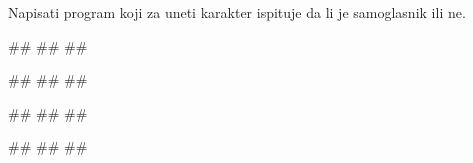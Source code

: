 \begin{Exercise}[label=KT_NG_24] 
Napisati program koji za uneti karakter ispituje da li je samoglasnik ili ne.

\begin{miditest}
\begin{upotreba}{1}
#\naslovInt#
##
##
\end{upotreba}
\end{miditest}
\begin{miditest}
\begin{upotreba}{2}
#\naslovInt#
##
##
\end{upotreba}
\end{miditest}

\begin{miditest}
\begin{upotreba}{3}
#\naslovInt#
##
##
\end{upotreba}
\end{miditest}
\begin{miditest}
\begin{upotreba}{4}
#\naslovInt#
##
##
\end{upotreba}
\end{miditest}

\end{Exercise}
\ifresenja
 \begin{Answer}[ref=KT_NG_24]
\end{Answer}
\fi


